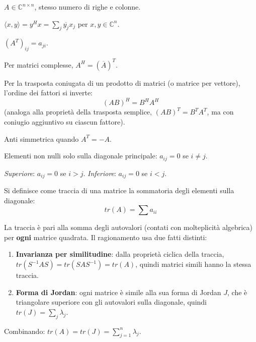 \documentclass[12pt,a4paper,]{report}
\begin{document}
\begin{definizione} 
    $A \in \mathbb{C}^{n \times n}$, stesso numero di righe e colonne.
\end{definizione}
\begin{definizione} 
    $\langle x, y \rangle = y^H x = \sum_j \overline{y_j} x_j$ per $x,y \in \mathbb{C}^n$.
\end{definizione}
\begin{definizione} 
    $(A^T)_{ij} = a_{ji}$.
\end{definizione}
\begin{definizione} 
    Per matrici complesse, $A^H = (\overline{A})^T$.
\end{definizione}
\begin{nota}
    \label{note: tras con prod}
    Per la trasposta coniugata di un prodotto di matrici (o matrice per vettore),
    l'ordine dei fattori si inverte:
    \[
    (AB)^H = B^HA^H
    \]
    (analoga alla proprietà della trasposta semplice, $(AB)^T=B^TA^T$, ma con coniugio
    aggiuntivo su ciascun fattore).
\end{nota}
\begin{definizione}
    Anti simmetrica quando $A^T = -A$.
\end{definizione}
\begin{definizione} Elementi non nulli solo sulla diagonale principale: $a_{ij}=0$ se $i \neq j$.\end{definizione}
\begin{definizione} \textit{Superiore}: $a_{ij}=0$ se $i>j$. \textit{Inferiore}: $a_{ij}=0$ se $i<j$.\end{definizione}
\begin{definizione}
    Si definisce come traccia di una matrice la sommatoria degli elementi sulla diagonale:
    \[
    tr(A) = \sum a_{ii}
    \]
\end{definizione}
\begin{nota}
    La traccia è pari alla somma degli autovalori (contati con molteplicità algebrica) per \textbf{ogni} matrice quadrata. Il ragionamento usa due fatti distinti:
    \begin{enumerate}
        \item \textbf{Invarianza per similitudine}: dalla proprietà ciclica della traccia, $tr(S^{-1}AS) = tr(SAS^{-1}) = tr(A)$, quindi matrici simili hanno la stessa traccia.
        \item \textbf{Forma di Jordan}: ogni matrice è simile alla sua forma di Jordan $J$, che è triangolare superiore con gli autovalori sulla diagonale, quindi $tr(J) = \sum_j \lambda_j$.
    \end{enumerate}
    Combinando: $tr(A) = tr(J) = \sum_{j=1}^n \lambda_j$.
\end{nota}
\end{document}
